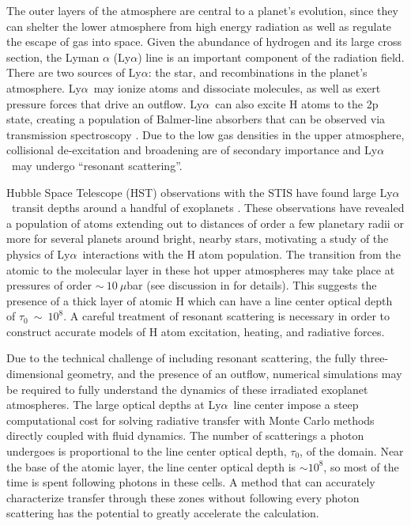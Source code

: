 \documentclass[linenumbers]{aastex63}
\newcommand\lya{Ly$\alpha$\ }
\begin{document}
The outer layers of the atmosphere are central to a planet's evolution, since they can shelter the lower atmosphere from high energy radiation as well as regulate the escape of gas into space. Given the abundance of hydrogen and its large cross section, the Lyman $\alpha$ (Ly$\alpha$) line is an important component of the radiation field. There are two sources of Ly$\alpha$: the star, and recombinations in the planet's atmosphere. \lya may ionize atoms and dissociate molecules, as well as exert pressure forces that drive an outflow. \lya can also excite H atoms to the 2p state, creating a population of Balmer-line absorbers that can be observed via transmission spectroscopy \citep{2017ApJ...851..150H}. Due to the low gas densities in the upper atmosphere, collisional de-excitation and broadening are of secondary importance and \lya may undergo ``resonant scattering''.

Hubble Space Telescope (HST) observations with the STIS have found large \lya transit depths around a handful of exoplanets \citep{2003Natur.422..143V, 2012A&A...543L...4L, 2012A&A...547A..18E, 2015Natur.522..459E,  2017A&A...597A..26B, 2017A&A...599L...3B, 2017A&A...602A.106B, 2018A&A...620A.147B, 2019AJ....158...50W, 2019EPSC...13.1928L, 2020ApJ...888L..21G,2021arXiv210309864B}. These observations have revealed a population of atoms extending out to distances of order a few planetary radii or more for several planets around bright, nearby stars, motivating a study of the physics of \lya interactions with the H atom population. The transition from the atomic to the molecular layer in these hot upper atmospheres may take place at pressures of order ${\sim}\ 10\ \mu$bar (see discussion in \citet{2017ApJ...851..150H} for details). This suggests the presence of a thick layer of atomic H which can have a line center optical depth of $\tau_0\ {\sim}\ 10^8$. A careful treatment of resonant scattering is necessary in order to construct accurate models of H atom excitation, heating, and radiative forces. 

Due to the technical challenge of including resonant scattering, the fully three-dimensional geometry, and the presence of an outflow, numerical simulations may be required to fully understand the dynamics of these irradiated exoplanet atmospheres. The large optical depths at \lya line center impose a steep computational cost for solving radiative transfer with Monte Carlo methods directly coupled with fluid dynamics. The number of scatterings a photon undergoes is proportional to the line center optical depth, $\tau_0$, of the domain.  Near the base of the atomic layer, the line center optical depth is ${\sim}10^8$, so most of the time is spent following photons in these cells. A method that can accurately characterize transfer through these zones without following every photon scattering has the potential to greatly accelerate the calculation.
\end{document}
